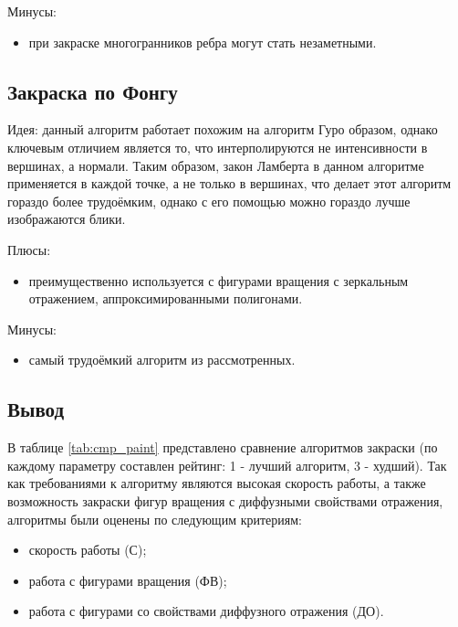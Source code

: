 Минусы:
\begin{itemize}
    \item при закраске многогранников ребра могут стать незаметными.
\end{itemize}

\subsection{Закраска по Фонгу}
Идея: данный алгоритм работает похожим на алгоритм Гуро образом, однако ключевым отличием является то, что интерполируются не интенсивности в вершинах, а нормали\cite{lmodels}. Таким образом, закон Ламберта в данном алгоритме применяется в каждой точке, а не только в вершинах, что делает этот алгоритм гораздо более трудоёмким, однако с его помощью можно гораздо лучше изображаются блики.

Плюсы:
\begin{itemize}
    \item преимущественно используется с фигурами вращения с зеркальным отражением, аппроксимированными полигонами.
\end{itemize}

Минусы:
\begin{itemize}
    \item самый трудоёмкий алгоритм из рассмотренных\cite{rogers}.
\end{itemize}

\subsection*{Вывод}

В таблице \ref{tab:cmp_paint} представлено сравнение алгоритмов\cite{rogers} закраски (по каждому параметру составлен рейтинг: 1 - лучший алгоритм, 3 - худший). Так как требованиями к алгоритму являются высокая скорость работы, а также возможность закраски фигур вращения с диффузными свойствами отражения, алгоритмы были оценены по следующим критериям:
\begin{itemize}
    \item скорость работы (С);
    \item работа с фигурами вращения (ФВ);
    \item работа с фигурами со свойствами диффузного отражения (ДО).
\end{itemize}

